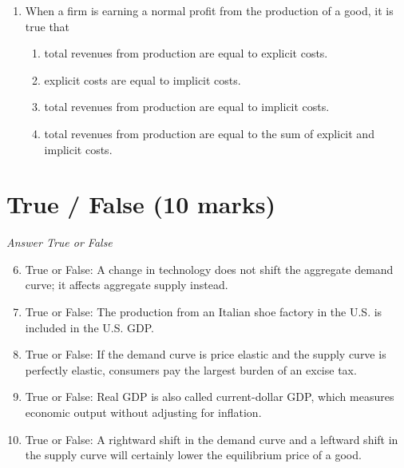 \documentclass[12pt]{article}
\begin{document}
\begin{enumerate}[label=\arabic*.]
\begin{enumerate}[label=(\alph*)]
    \item Exports from the United States will increase.
    \item U.S. residents will take more vacations in foreign countries.
    \item More foreign visitors will travel to the United States.
\end{enumerate}
\item When a firm is earning a normal profit from the production of a good, it is true that
\begin{enumerate}[label=(\alph*)]
    \item total revenues from production are equal to explicit costs.
    \item explicit costs are equal to implicit costs.
    \item total revenues from production are equal to implicit costs.
    \item total revenues from production are equal to the sum of explicit and implicit costs.
\end{enumerate}
\end{enumerate}

\section*{True / False (10 marks)}
\textit{Answer True or False}
\begin{enumerate}[label=\arabic*.]
\setcounter{enumi}{5}
\item True or False: A change in technology does not shift the aggregate demand curve; it affects aggregate supply instead.
\item True or False: The production from an Italian shoe factory in the U.S. is included in the U.S. GDP.
\item True or False: If the demand curve is price elastic and the supply curve is perfectly elastic, consumers pay the largest burden of an excise tax.
\item True or False: Real GDP is also called current-dollar GDP, which measures economic output without adjusting for inflation.
\item True or False: A rightward shift in the demand curve and a leftward shift in the supply curve will certainly lower the equilibrium price of a good.
\end{enumerate}
\end{document}
